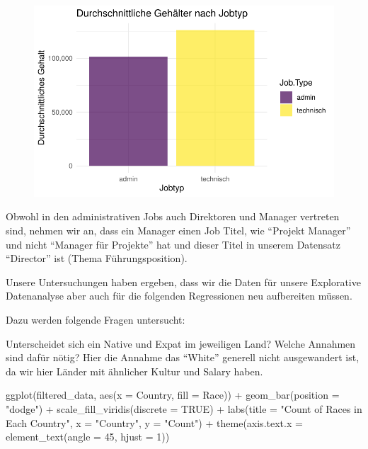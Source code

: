 \documentclass[
  letterpaper,
  DIV=11,
  numbers=noendperiod]{scrartcl}
\newenvironment{Shaded}{\begin{snugshade}}{\end{snugshade}}
\newcommand{\AttributeTok}[1]{\textcolor[rgb]{0.40,0.45,0.13}{#1}}
\newcommand{\ConstantTok}[1]{\textcolor[rgb]{0.56,0.35,0.01}{#1}}
\newcommand{\DecValTok}[1]{\textcolor[rgb]{0.68,0.00,0.00}{#1}}
\newcommand{\FunctionTok}[1]{\textcolor[rgb]{0.28,0.35,0.67}{#1}}
\newcommand{\NormalTok}[1]{\textcolor[rgb]{0.00,0.23,0.31}{#1}}
\newcommand{\SpecialCharTok}[1]{\textcolor[rgb]{0.37,0.37,0.37}{#1}}
\newcommand{\StringTok}[1]{\textcolor[rgb]{0.13,0.47,0.30}{#1}}
\begin{document}
\begin{figure}[H]

{\centering \includegraphics{main_doc_files/figure-pdf/unnamed-chunk-63-1.pdf}

}

\end{figure}

Obwohl in den administrativen Jobs auch Direktoren und Manager vertreten
sind, nehmen wir an, dass ein Manager einen Job Titel, wie ``Projekt
Manager'' und nicht ``Manager für Projekte'' hat und dieser Titel in
unserem Datensatz ``Director'' ist (Thema Führungsposition).

Unsere Untersuchungen haben ergeben, dass wir die Daten für unsere
Explorative Datenanalyse aber auch für die folgenden Regressionen neu
aufbereiten müssen.

Dazu werden folgende Fragen untersucht:

Unterscheidet sich ein Native und Expat im jeweiligen Land? Welche
Annahmen sind dafür nötig? Hier die Annahme das ``White'' generell nicht
ausgewandert ist, da wir hier Länder mit ähnlicher Kultur und Salary
haben.

\begin{Shaded}
\begin{Highlighting}[]
\FunctionTok{ggplot}\NormalTok{(filtered\_data, }\FunctionTok{aes}\NormalTok{(}\AttributeTok{x =}\NormalTok{ Country, }\AttributeTok{fill =}\NormalTok{ Race)) }\SpecialCharTok{+}
  \FunctionTok{geom\_bar}\NormalTok{(}\AttributeTok{position =} \StringTok{"dodge"}\NormalTok{) }\SpecialCharTok{+}
  \FunctionTok{scale\_fill\_viridis}\NormalTok{(}\AttributeTok{discrete =} \ConstantTok{TRUE}\NormalTok{) }\SpecialCharTok{+}
  \FunctionTok{labs}\NormalTok{(}\AttributeTok{title =} \StringTok{"Count of Races in Each Country"}\NormalTok{,}
       \AttributeTok{x =} \StringTok{"Country"}\NormalTok{,}
       \AttributeTok{y =} \StringTok{"Count"}\NormalTok{) }\SpecialCharTok{+}
  \FunctionTok{theme}\NormalTok{(}\AttributeTok{axis.text.x =} \FunctionTok{element\_text}\NormalTok{(}\AttributeTok{angle =} \DecValTok{45}\NormalTok{, }\AttributeTok{hjust =} \DecValTok{1}\NormalTok{))}
\end{Highlighting}
\end{Shaded}
\end{document}
